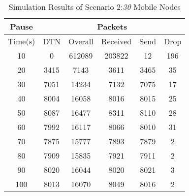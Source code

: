 \documentclass[3p,times]{elsarticle}
\begin{document}
\begin{table}[b]
\centering
\label{t6}
\caption{Simulation Results of Scenario 2:\emph{30} Mobile Nodes}
\begin{tabular}{|c|c|c|c|c|c|}
\hline
Pause  & \multicolumn{5}{c|}{Packets} \\
\hline
Time(s) & DTN   & Overall & Received & Send & Drop \\
\hline
10 & 0 & 612089 & 203822 & 12 &  196 \\
20 & 3415 & 7143 & 3611 & 3465 & 35\\
30 & 7051 & 14234 & 7132 & 7075 & 17 \\
40 & 8004 & 16058 & 8016 & 8015 & 25 \\
50 & 8087 & 16477 & 8311 & 8110 &  28 \\
60 & 7992 & 16117 & 8066 & 8010 &  31 \\
70 & 7875 & 15777 & 7893 & 7879 &  2\\
80 & 7909 & 15835 & 7921 & 7911 &  2 \\
90 & 8020 & 16044 & 8020 & 8021 &  3 \\
100 & 8013 & 16070 & 8049 & 8016 &  2 \\
\hline
\end{tabular}
\end{table}
\end{document}
